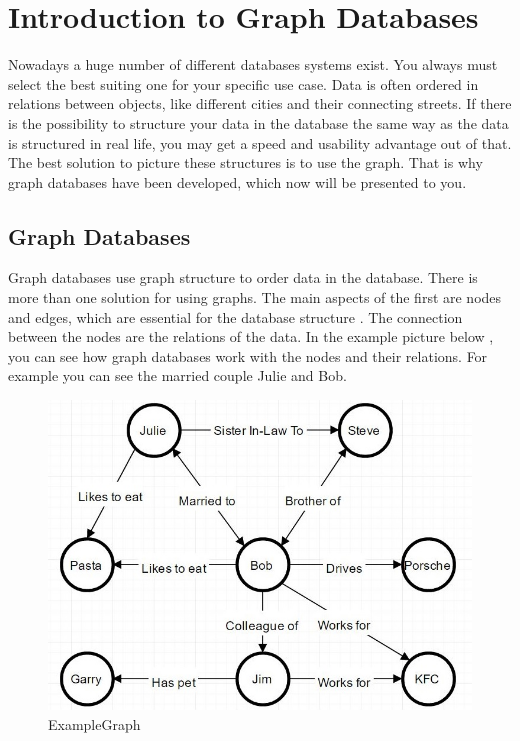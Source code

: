 \section{Introduction to Graph Databases}

Nowadays a huge number of different databases systems exist. You always must select the best suiting one for your specific use case. Data is often ordered in relations between objects, like different cities and their connecting streets. 
If there is the possibility to structure your data in the database the same way as the data is structured in real life, you may get a speed and usability advantage out of that. The best solution to picture these structures is to use the graph. That is why graph databases have been developed, which now will be presented to you.

\subsection{Graph Databases}

Graph databases use graph structure to order data in the database. There is more than one solution for using graphs. The main aspects of the first are nodes and edges, which are essential for the database structure \cite[pp. 1-4]{RobinsonWebberEifrem.2013}.
The connection between the nodes are the relations of the data. In the example picture below \cite[para. 1]{Rouse.2016}, you can see how graph databases work with the nodes and their relations. For example you can see the married couple Julie and Bob.

\begin{figure}[H]
	\begin{center}
		\includegraphics[scale=0.8,keepaspectratio]{images/neo4j/IntroExampleGraph.JPG}
		\caption{ExampleGraph}
	\end{center}
\end{figure}

